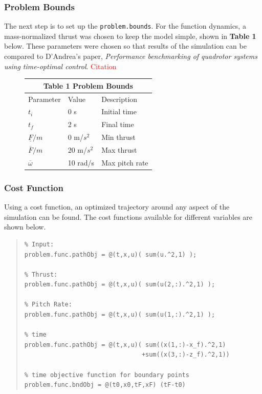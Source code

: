 \documentclass[12pt]{article}
\begin{document}
\subsubsection{Problem Bounds}
The next step is to set up the \lstinline!problem.bounds!. For the function dynamics, a mass-normalized thrust was chosen to keep the model simple, shown in \textbf{Table 1} below. These parameters were chosen so that results of the simulation can be compared to D'Andrea's paper, \textit{Performance benchmarking of quadrotor systems using time-optimal control}.  \textcolor{red}{Citation}
\begin{figure}[H]
\begin{center}
\begin{tabular}{ |p{2.5cm}||p{2cm}||p{3cm}| }
 \hline
 \multicolumn{3}{|c|}{\textbf{Table 1}   Problem Bounds} \\
 \hline
 Parameter & Value & Description\\
 \hline
 $t_{i}$   & 0 s  & Initial time\\
 $t_{f}$  & 2 s  & Final time\\
 $\underline{F}/m$ & 0 m/$s^{2}$ & Min thrust\\
 $\overline{F}/m$ & 20 m/$s^{2}$ & Max thrust\\
 $\overline{\omega}$ & 10 rad/s & Max pitch rate \\
 \hline
\end{tabular}
\end{center}
\end{figure}

\clearpage

\subsubsection{Cost Function}
Using a cost function, an optimized trajectory around any aspect of the simulation can be found. The cost functions available for different variables are shown below. 
\begin{quote}
\begin{lstlisting}
% Input:
problem.func.pathObj = @(t,x,u)( sum(u.^2,1) );

% Thrust:
problem.func.pathObj = @(t,x,u)( sum(u(2,:).^2,1) );

% Pitch Rate:
problem.func.pathObj = @(t,x,u)( sum(u(1,:).^2,1) );

% time
problem.func.pathObj = @(t,x,u)( sum((x(1,:)-x_f).^2,1) 
                                +sum((x(3,:)-z_f).^2,1))

% time objective function for boundary points
problem.func.bndObj = @(t0,x0,tF,xF) (tF-t0)

\end{lstlisting}
\end{quote}
\end{document}
